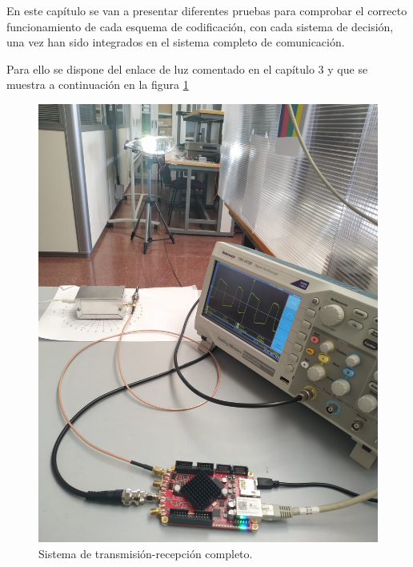 
\label{chp:App3}
\minitoc
En este capítulo se van a presentar diferentes pruebas para comprobar el 
correcto funcionamiento
de cada esquema de codificación, con cada sistema de decisión, una vez han sido 
integrados en el sistema completo de comunicación. 

Para ello se dispone del enlace de luz comentado en el capítulo 3 y que se muestra 
a continuación en la figura \ref{enlace2}

\begin{figure}[ht]
    \centering
    \includegraphics[scale=0.1]{./figuras/Enlace.png}
    \caption{\small{Sistema de transmisión-recepción completo.}}
    \label{enlace2}%
\end{figure}

